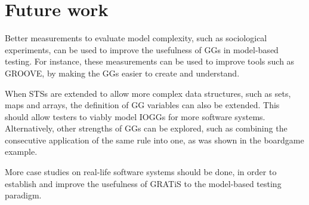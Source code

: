 \section{Future work}\label{sec:future-work}
Better measurements to evaluate model complexity, such as sociological experiments, can be used to improve the usefulness of GGs in model-based testing. For instance, these measurements can be used to improve tools such as GROOVE, by making the GGs easier to create and understand.

When STSs are extended to allow more complex data structures, such as sets, maps and arrays, the definition of GG variables can also be extended. This should allow testers to viably model IOGGs for more software systems. Alternatively, other strengths of GGs can be explored, such as combining the consecutive application of the same rule into one, as was shown in the boardgame example.

More case studies on real-life software systems should be done, in order to establish and improve the usefulness of GRATiS to the model-based testing paradigm.